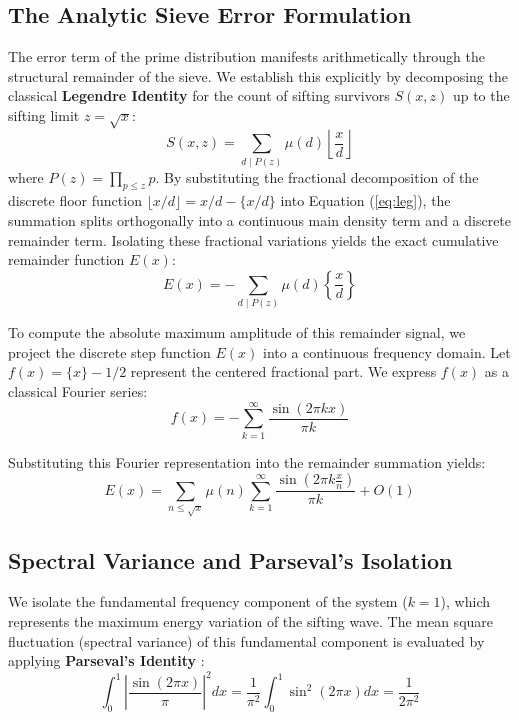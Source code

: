 \documentclass[twoside,9pt]{extarticle}
\begin{document}
\subsection{The Analytic Sieve Error Formulation}
The error term of the prime distribution manifests arithmetically through the structural remainder of the sieve. We establish this explicitly by decomposing the classical \textbf{Legendre Identity} for the count of sifting survivors $S(x, z)$ up to the sifting limit $z = \sqrt{x}$:
\begin{equation}
\label{eq:leg}
S(x, z) = \sum_{d \mid P(z)} \mu(d) \left\lfloor \frac{x}{d} \right\rfloor
\end{equation}
where $P(z) = \prod_{p \le z} p$. By substituting the fractional decomposition of the discrete floor function $\lfloor x/d \rfloor = x/d - \{x/d\}$ into Equation (\ref{eq:leg}), the summation splits orthogonally into a continuous main density term and a discrete remainder term. Isolating these fractional variations yields the exact cumulative remainder function $E(x)$:
\begin{equation}
E(x) = -\sum_{d \mid P(z)} \mu(d) \left\{ \frac{x}{d} \right\}
\end{equation}

To compute the absolute maximum amplitude of this remainder signal, we project the discrete step function $E(x)$ into a continuous frequency domain. Let $f(x) = \{x\} - 1/2$ represent the centered fractional part. We express $f(x)$ as a classical Fourier series:
\begin{equation}
f(x) = -\sum_{k=1}^{\infty} \frac{\sin(2\pi k x)}{\pi k}
\end{equation}

Substituting this Fourier representation into the remainder summation yields:
\begin{equation}
E(x) = \sum_{n \le \sqrt{x}} \mu(n) \sum_{k=1}^{\infty} \frac{\sin\left(2\pi k \frac{x}{n}\right)}{\pi k} + O(1)
\end{equation}

\subsection{Spectral Variance and Parseval's Isolation}
We isolate the fundamental frequency component of the system ($k=1$), which represents the maximum energy variation of the sifting wave. The mean square fluctuation (spectral variance) of this fundamental component is evaluated by applying \textbf{Parseval's Identity} \cite{stein2003fourier}:
\begin{equation}
\int_{0}^{1} \left| \frac{\sin(2\pi x)}{\pi} \right|^2 dx = \frac{1}{\pi^2} \int_{0}^{1} \sin^2(2\pi x) dx = \frac{1}{2\pi^2}
\end{equation}
\end{document}
